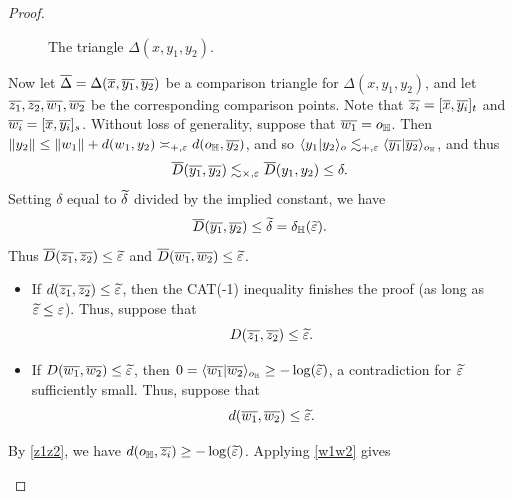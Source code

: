 \begin{proof}
\begin{itemize}
\begin{figure}
\begin{center}
\caption[The triangle $\Delta(x,y_1,y_2)$]{The triangle $\Delta(x,y_1,y_2)$.}
\label{figurexyz}
\end{center}
\end{figure}

Now let $\overline{\Delta} = \Delta(\overline x,\overline{y_1},\overline{y_2})$ be a comparison triangle for $\Delta(x,y_1,y_2)$, and let $\overline{z_1},\overline{z_2},\overline{w_1},\overline{w_2}$ be the corresponding comparison points. Note that $\overline{z_i} = [\overline x,\overline{y_i}]_t$ and $\overline{w_i} = [\overline x,\overline{y_i}]_s$. Without loss of generality, suppose that $\wbar{w_1} = \zero_\H$. Then $\dox{y_2} \leq \dox{w_1} + \dist(w_1,y_2) \asymp_{\plus,\epsilon} \dist(\zero_\H,\wbar{y_2})$, and so $\lb y_1|y_2\rb_\zero \lesssim_{\plus,\epsilon} \lb \wbar{y_1}|\wbar{y_2}\rb_{\zero_\H}$, and thus
\[
\overline{D}(\overline{y_1},\overline{y_2}) \lesssim_{\times,\varepsilon} \overline{D}(y_1,y_2) \leq \delta.
\]
Setting $\delta$ equal to $\widetilde\delta$ divided by the implied constant, we have
\[
\wbar\Dist(\wbar{y_1},\wbar{y_2}) \leq \w\delta = \delta_\H(\w\epsilon).
\]
Thus $\overline{D}(\overline{z_1},\overline{z_2})\leq\widetilde{\varepsilon}$ and $\overline{D}(\overline{w_1},\overline{w_2})\leq\widetilde{\varepsilon}$.
\begin{itemize}
\item If $d(\overline{z_1},\overline{z_2})\leq\widetilde{\varepsilon}$, then the CAT(-1) inequality finishes the proof (as long as $\widetilde{\varepsilon}\leq \varepsilon$). Thus, suppose that
\begin{equation}
\label{z1z2}
D(\overline{z_1},\overline{z_2}) \leq \widetilde{\varepsilon}.
\end{equation}
\item If $D(\overline{w_1},\overline{w_2})\leq\widetilde{\varepsilon}$, then $0 = \lb \wbar{w_1}|\wbar{w_2}\rb_{\zero_\H} \geq -\log(\w\epsilon)$, a contradiction for $\widetilde{\varepsilon}$ sufficiently small. Thus, suppose that
\begin{equation}
\label{w1w2}
d(\overline{w_1},\overline{w_2}) \leq\widetilde{\varepsilon}.
\end{equation}
\end{itemize}
By \eqref{z1z2}, we have $\dist(\zero_\H,\wbar{z_i}) \geq -\log(\w\epsilon)$. Applying \eqref{w1w2} gives

\end{itemize}
\end{proof}
